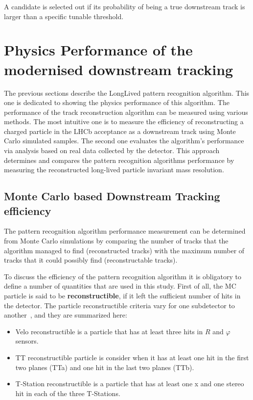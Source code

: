 A candidate is selected out if its probability of being a true downstream track is larger than a specific tunable threshold.

\section{Physics Performance of the modernised downstream tracking}
\label{sec:physic_performance}
The previous sections describe the LongLived pattern recognition algorithm. This one is dedicated to showing the physics performance of this algorithm. The performance of the track reconstruction algorithm can be measured using various methods. The most intuitive one is to measure the efficiency of reconstructing a charged particle in the LHCb acceptance as a downstream track using Monte Carlo simulated samples.
The second one evaluates the algorithm's performance via analysis based on real data collected by the detector. This approach determines and compares the pattern recognition algorithms performance by measuring the reconstructed long-lived particle invariant mass resolution.

\subsection{Monte Carlo based Downstream Tracking efficiency}

The pattern recognition algorithm performance measurement can be determined from Monte Carlo simulations by comparing the number of tracks that the algorithm managed to find (reconstructed tracks) with the maximum number of tracks that it could possibly find (reconstructable tracks). 

To discuss the efficiency of the pattern recognition algorithm it is obligatory to define a number of quantities that are used in this study.  First of all, the MC particle is said to be \textbf{reconstructible}, if it left the sufficient number of hits in the detector. The particle reconstructible criteria vary for one subdetector to another~\cite{track_def}, and they are summarized here:

\begin{itemize}
    \item Velo reconstructible is a particle that has at least three hits in $R$ and $\varphi$ sensors.
    \item TT reconstructible particle is consider when it has at least one hit in the first two planes (TTa) and one hit in the last two planes (TTb). 
    \item T-Station reconstructible is a particle that has at least one x and one stereo hit in each of the three T-Stations. 
\end{itemize}

